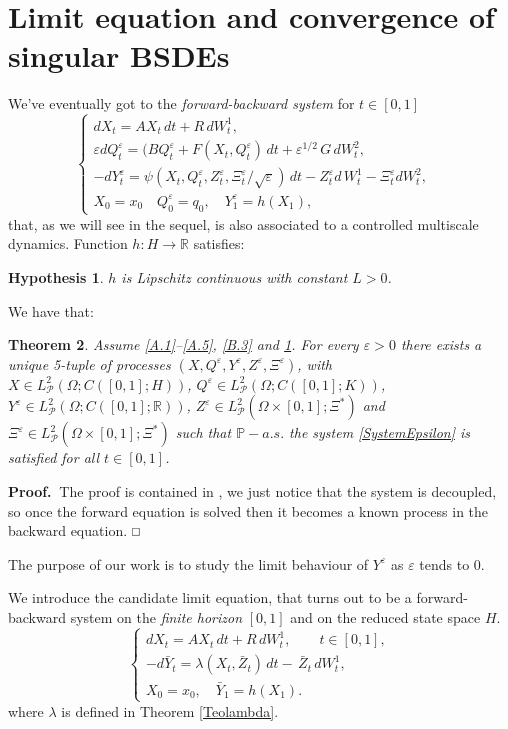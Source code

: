 \documentclass[reqno,a4paper,11 pt]{article}
\def \P {\mathcal{P}}
\def \e {\varepsilon}
\def \R {\mathbb{R}}
\newtheorem{theorem}{Theorem}[section]
\newtheorem{hypothesis}[theorem]{Hypothesis}
\numberwithin{equation}{section}
\def\Dim{\noindent\hbox{{\bf Proof.}$\;\; $}}          %
\def\finedim{{\hfill\hbox{\enspace${ \square}$}} \smallskip}    %
\def\sqr#1#2{{\vcenter{\vbox{\hrule height .#2pt
     \hbox{\vrule width .#2pt height#1pt \kern#1pt \vrule
     width .#2pt} \hrule height .#2pt}}}}
\def\square{\mathchoice\sqr54\sqr54\sqr{4.1}3\sqr{3.5}3}
\begin{document}
\section{Limit equation and convergence of singular BSDEs}
We've eventually  got to the  {\em forward-backward system} for  $t \in [0,1]$
\begin{equation}\label{SystemEpsilon}
\begin{cases}
dX_t= AX_t  \, dt + R  \, dW^1_t, & \\ 
 \e dQ^\e_t= (BQ^\e_t+ F(X_t,Q^\e_t) \,dt + \e^{1/2}  \,G \, dW^2_t, &  \\ 
- dY^{\e}_t  =  \psi(X_t,Q^\e_t,Z^\e_t, \Xi^\e_t / \sqrt{\e}) \,dt - Z^\e _t d\, W^1_t  - \Xi^\e_t dW_t^2, \\ 
X_0= x_0 \quad Q^\e_0=q_0, \quad {Y}^\e_1=h(X_1),
\end{cases} 
\end{equation}
that, as  we will see in the sequel, is also  associated to a controlled multiscale dynamics. 
Function  $h: H\rightarrow \mathbb{R}$ satisfies:
\begin{hypothesis}\label{B.4} $h$ is  Lipschitz continuous with constant $L >0$.
\end{hypothesis}

We have that:
\begin{theorem}\label{esistenceepsilon}
Assume \ref{A.1}--\ref{A.5}, \ref{B.3} and \ref{B.4}. For every $\e >0$  there exists a unique  5-tuple of processes $(X, Q^\e,Y^\e, Z^\e,\Xi^\e)$,  with $ X\!\in L^2_{\mathcal{P}}(\Omega;C([0,1];H))$, $Q^\e \!\in L^2_{\mathcal{P}}(\Omega;C([0,1];K))$, $Y^\e\! \in L^2_{\mathcal{P}}(\Omega;C([0,1];\R))$, $Z^\e \!\in L^2_\P (\Omega\times [0,1];\Xi^*)$ and  $\Xi^\e \!\in L^2_\P (\Omega\times [0,1];\Xi^*)$ such that $\mathbb{P}-a.s.$  the  system  \eqref{SystemEpsilon} is satisfied for all $ t \in [0,1]$.
\end{theorem}
\Dim The proof is contained in \cite[Propositions 3.2 and  5.2]{FuTes}, we just notice that
the system is decoupled, so once the forward equation is solved then it becomes a known process in the backward equation. 
\finedim


\medskip

The purpose of our work is to study the limit behaviour of $Y^\e$ as $\e $ tends to $0$.

We introduce the candidate limit equation, that turns out to be a forward-backward system on the {\em finite horizon} $[0,1]$ and on the reduced state space $H$.
\begin{equation}\label{LimitEquation}
\begin{cases}
d X_t =   AX_t \, dt + R\, d W^1 _t, \qquad t \in [0,1], \\
-d\bar{Y}_t  = \lambda({X}_t,\bar{Z}_t)\,dt - \, \bar{Z}_t\, dW^1_t,   \\
X_0= x_0, \quad \bar{Y}_1=h(X_1).
\end{cases} 
\end{equation}
where $\lambda$ is defined in Theorem \ref{Teolambda}.
\end{document}
